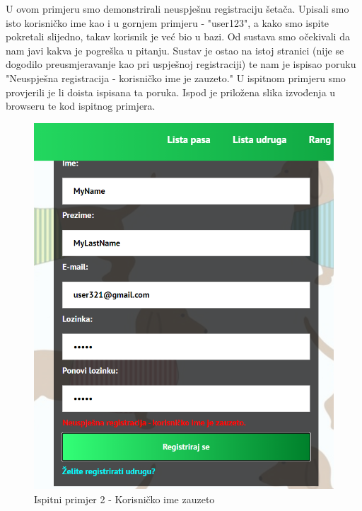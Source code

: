 		 U ovom primjeru smo demonstrirali neuspješnu registraciju šetača. Upisali smo isto korisničko ime kao i u gornjem primjeru - "user123", a kako smo ispite pokretali slijedno, takav korisnik je već bio u bazi. Od sustava smo očekivali da nam javi kakva je pogreška u pitanju. Sustav je ostao na istoj stranici (nije se dogodilo preusmjeravanje kao pri uspješnoj registraciji) te nam je ispisao poruku "Neuspješna registracija - korisničko ime je zauzeto." U ispitnom primjeru smo provjerili je li doista ispisana ta poruka. Ispod je priložena slika izvođenja u browseru te kod ispitnog primjera. 
		 
		 	\begin{figure}[H]
		 		\centerline{
		 		\includegraphics[scale=0.65]{slike/UsernameError.PNG}}
		 		\caption{Ispitni primjer 2 - Korisničko ime zauzeto}
		 		\centering
		 	\end{figure}
			 

